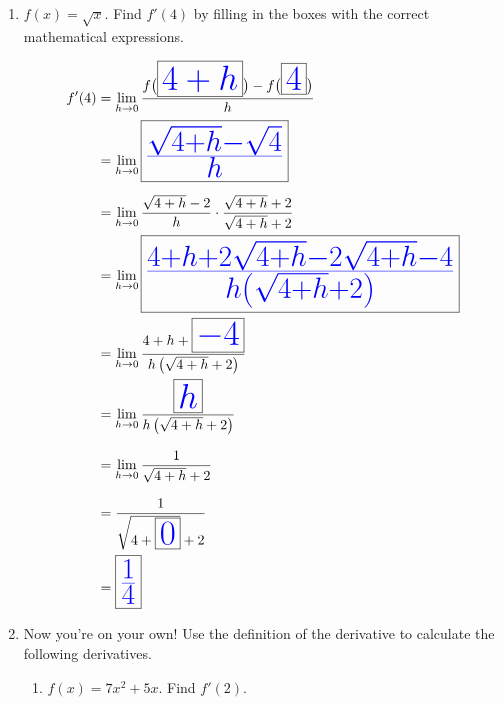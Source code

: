 \documentclass[letterpaper,11pt]{article}
\def\ds{\displaystyle}
\newcommand{\tsol}[1]{\textcolor{blue}{#1}}
\newcommand{\tsol}[1]{\textcolor{white}{#1}}
\newcommand{\ablank}[1]{
\begin{Huge}
\fbox{$\textcolor{white}{#1}$}
\end{Huge}
}
\begin{document}
\begin{enumerate}
\newpage

\item $f(x)=\sqrt{x}$. Find $f'(4)$ by filling in the boxes with the correct mathematical expressions.
\begin{Large}
\begin{spreadlines}{.4 in}
\begin{align*}
f'(4) &= \lim_{h \rightarrow 0} \frac{f\bigl(\ablank{\tsol{4+h}}\bigr)-f\bigl(\ablank{\tsol{4}}\bigr)}{h} \\
&= \lim_{h \rightarrow 0} \ablank{\tsol{\frac{\sqrt{4+h}-\sqrt{4}}{h}}} \\
&= \lim_{h \rightarrow 0} \frac{\sqrt{4+h}-2}{h} \cdot \frac{\sqrt{4+h}+2}{\sqrt{4+h}+2} \\
&= \lim_{h \rightarrow 0} \ablank{\tsol{\frac{4+h+2\sqrt{4+h}-2\sqrt{4+h}-4}{h \left(\sqrt{4+h}+2 \right)}}} \\
&= \lim_{h \rightarrow 0} \frac{4+h+\ablank{\tsol{-4}}}{h\left(\sqrt{4+h}+2\right)} \\
&= \lim_{h \rightarrow 0} \frac{\ablank{\tsol{h}}}{h\left(\sqrt{4+h}+2\right)} \\
&= \lim_{h \rightarrow 0} \frac{1}{\sqrt{4+h}+2} \\
&= \frac{1}{\sqrt{4+\ablank{\tsol{0}}}+2} \\
&= \ablank{\tsol{\frac{1}{4}}} \\
\end{align*}
\end{spreadlines}
\end{Large}

\newpage
\item Now you're on your own!  Use the definition of the derivative to calculate the following derivatives.
\begin{enumerate}
\item $\ds f(x) = 7x^2 + 5x$.  Find $f'(2)$.

\bigskip


\end{enumerate}
\end{enumerate}
\end{document}
